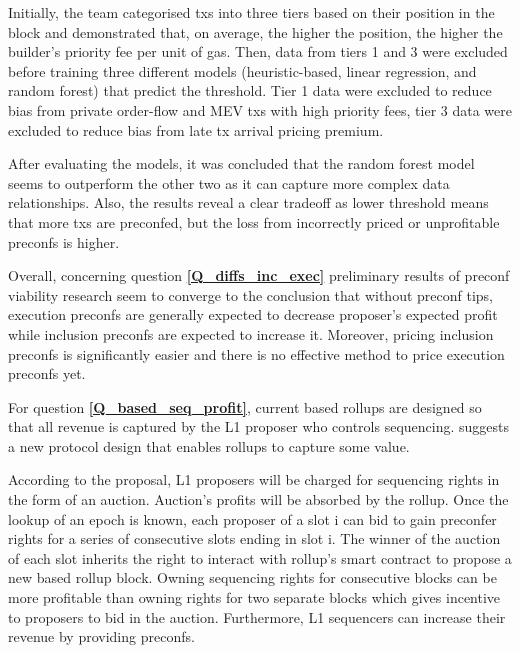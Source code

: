 \documentclass[a4paper]{article}
\theoremstyle{boldstyle}
\begin{document}
    Initially, the team categorised txs into three tiers based on their position in the block and demonstrated that, on average, the higher the position, the higher the builder's priority fee per unit of gas. Then, data from tiers 1 and 3 were excluded before training three different models (heuristic-based, linear regression, and random forest) that predict the threshold. Tier 1 data were excluded to reduce bias from private order-flow and MEV txs with high priority fees, tier 3 data were excluded to reduce bias from late tx arrival pricing premium.

    After evaluating the models, it was concluded that the random forest model seems to outperform the other two as it can capture more complex data relationships. Also, the results reveal a clear tradeoff as lower threshold means that more txs are preconfed, but the loss from incorrectly priced or unprofitable preconfs is higher.

    Overall, concerning question \textbf{\ref{Q_diffs_inc_exec}} preliminary results of preconf viability research seem to converge to the conclusion that without preconf tips, execution preconfs are generally expected to decrease proposer's expected profit while inclusion preconfs are expected to increase it. Moreover, pricing inclusion preconfs is significantly easier and there is no effective method to price execution preconfs yet.

    For question \textbf{\ref{Q_based_seq_profit}}, current based rollups are designed so that all revenue is captured by the L1 proposer who controls sequencing. \cite{W:Value-CapturingBasedRollupswithBasedPreconfirmations} suggests a new protocol design that enables rollups to capture some value.

    According to the proposal, L1 proposers will be charged for sequencing rights in the form of an auction. Auction's profits will be absorbed by the rollup. Once the lookup of an epoch is known, each proposer of a slot i can bid to gain preconfer rights for a series of consecutive slots ending in slot i. The winner of the auction of each slot inherits the right to interact with rollup's smart contract to propose a new based rollup block. Owning sequencing rights for consecutive blocks can be more profitable than owning rights for two separate blocks which gives incentive to proposers to bid in the auction. Furthermore, L1 sequencers can increase their revenue by providing preconfs.
\end{document}
